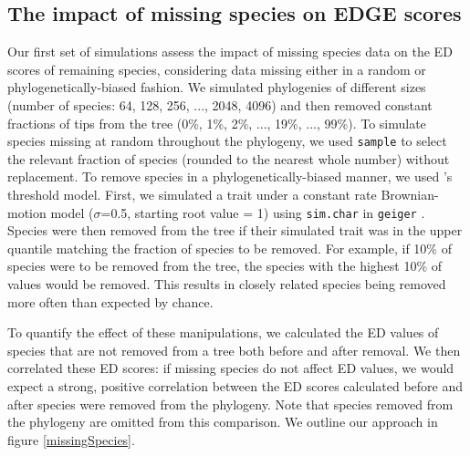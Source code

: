 \documentclass[12pt,english]{article}
\begin{document}
\subsection*{The impact of missing species on EDGE scores}
Our first set of simulations assess the impact of missing species data on the ED
scores of remaining species, considering data missing either in a random or
phylogenetically-biased fashion. We simulated phylogenies of different sizes
(number of species: 64, 128, 256, ..., 2048, 4096) and then removed constant
fractions of tips from the tree (0\%, 1\%, 2\%, ..., 19\%, ..., 99\%). To
simulate species missing at random throughout the phylogeny,
we used \texttt{sample} to select the relevant fraction of
species (rounded to the nearest whole number) without replacement. To remove
species in a phylogenetically-biased manner, we used
\textcite{Felsenstein2005}'s threshold model. First, we simulated a trait under
a constant rate Brownian-motion model ($\sigma$=0.5, starting root value = 1)
using \texttt{sim.char} in \texttt{geiger} 
\autocite{Pennell2014}. Species were then removed from the tree if their
simulated trait was in the upper quantile matching the fraction of species to be
removed. For example, if 10\% of species were to be removed from the tree,
the species with the highest 10\% of values would be removed. This
results in closely related species being removed more often than expected by chance.

To quantify the effect of these manipulations, we calculated the ED values of
species that are not removed from a tree both before and after removal.
We then correlated these ED scores: if missing species do not affect ED
values, we would expect a strong, positive correlation between the ED scores
calculated before and after species were removed from the phylogeny. Note that
species removed from the phylogeny are omitted from this comparison. We outline
our approach in figure \ref{missingSpecies}.
\end{document}
